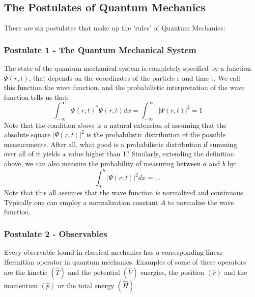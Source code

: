 \documentclass[12pt]{article}
\begin{document}
{\subsection{The Postulates of Quantum Mechanics}
There are six postulates \cite{postulates} that make up the 'rules' of Quantum Mechanics:
\subsubsection*{Postulate 1 - The Quantum Mechanical System}
The state of the quantum mechanical system is completely specified by a function $\Psi(r, t)$, that depends on the coordinates of the particle r and time t. \newline
We call this function the wave function, and the probabilistic interpretation of the wave function tells us that:
\begin{equation*}
    \int_{-\infty}^\infty \Psi(r, t)^* \Psi(r, t) d x= \int_{-\infty}^\infty | \Psi(r, t) |^2 = 1
\end{equation*}
\newline Note that the condition above is a natural extension of assuming that the absolute square $|\Psi(r, t)|^2$ is the probabilistic distribution of the possible measurements. After all, what good is a probabilistic distribution if summing over all of it yields a value higher than 1? Similarly, extending the definition above, we can also measure the probability of measuring between $a$ and $b$ by:
\begin{equation*}
     \int_{a}^b | \Psi(r, t) |^2 dx = ...
\end{equation*}
\newline Note that this all assumes that the wave function is normalized and continuous. Typically one can employ a normalization constant $A$ to normalize the wave function.
\subsubsection*{Postulate 2 - Observables}
Every observable found in classical mechanics has a corresponding linear Hermitian operator in quantum mechanics. Examples of some of these operators are the kinetic $(\hat T)$ and the potential $(\hat V)$ energies, the position $(\hat r)$ and the momentum $(\hat p)$ or the total energy $(\hat H)$
\newpage
}
\end{document}

